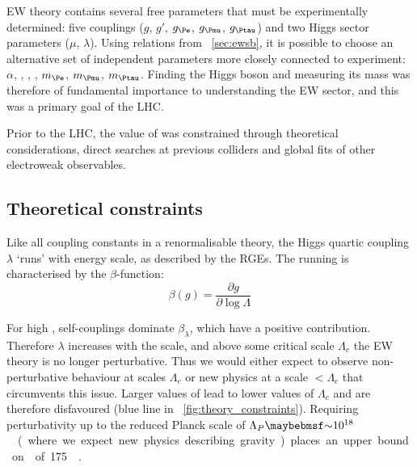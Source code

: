 
\ac{EW} theory contains several free parameters that must be experimentally 
determined: five couplings ($g$, $g'$, $g_{\Pe}$, $g_{\Pmu}$, $g_{\Ptau}$) and two 
Higgs sector parameters ($\mu$, $\lambda$). Using relations from \Section~\ref{sec:ewsb},
it is possible to choose an alternative set of independent parameters more closely
connected to experiment: $\alpha$, \mW, \mZ, \mH, $m_{\Pe}$, $m_{\Pmu}$, $m_{\Ptau}$.
Finding the Higgs boson and measuring its mass was therefore of fundamental importance to 
understanding the \ac{EW} sector, and this was a primary goal of the \ac{LHC}. 

Prior to the \ac{LHC}, the value of \mH was constrained through theoretical considerations,
direct searches at previous colliders and global fits of other electroweak observables.



\subsection{Theoretical constraints}
\label{sec:prior_constraints:theory}

Like all coupling constants in a renormalisable theory, the Higgs quartic coupling 
$\lambda$ `runs' with energy scale, as described by the \acp{RGE}. The running is
characterised by the $\beta$-function:
\begin{equation*}
	\beta (g) = \frac{\partial g}{\partial \log\Lambda}
\end{equation*}

For high \mH, self-couplings dominate $\beta_{\lambda}$, which have a
positive contribution. Therefore $\lambda$ increases with the scale, and above some 
critical scale $\Lambda_c$ the \ac{EW} theory is no longer perturbative. Thus we would 
either expect to observe non-perturbative behaviour at scales \about$\Lambda_c$ or new 
physics at a scale $<\Lambda_c$ that circumvents this issue. Larger values of \mH lead to 
lower values of $\Lambda_c$ and are therefore disfavoured (blue line in 
\Figure~\ref{fig:theory_constraints}). Requiring perturbativity up to the 
reduced Planck scale of \unit{$\Lambda_{P} \about 10^{18}$}{\GeV} (where we expect new 
physics describing gravity) places an upper bound on \mH of \unit{175}{\GeV} 
\cite{Ellis:2009}.

